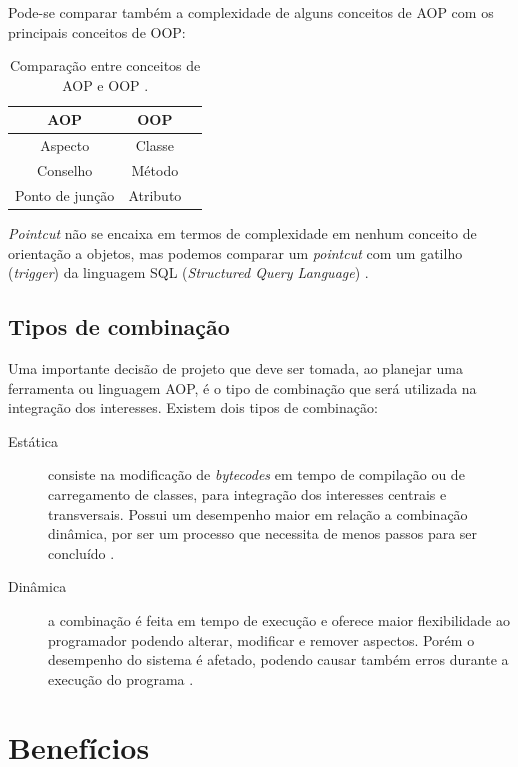 \documentclass[tc,oneside]{iiufrgs}
\begin{document}
Pode-se comparar também a complexidade de alguns conceitos de AOP com os principais conceitos de OOP:

\begin{table}[ht]
	\centering
	\caption{Comparação entre conceitos de AOP e OOP \cite{jacobson2004aspect}.}
	
	\begin{tabular}[h]{c c l}
		\hline 
		\textbf{AOP} & \textbf{OOP} \\
		\hline
		Aspecto&Classe \\
		Conselho&Método \\
		Ponto de junção&Atributo \\
		\hline
	\end{tabular}
	\label{tab:comparacaoAOPOOP}
\end{table}

\textit{Pointcut} não se encaixa em termos de complexidade em nenhum conceito de orientação a objetos, mas podemos comparar um \textit{pointcut} com um gatilho (\textit{trigger}) da linguagem SQL (\textit{Structured Query Language}) \cite{jacobson2004aspect}.

\subsection{Tipos de combinação}

Uma importante decisão de projeto que deve ser tomada, ao planejar uma ferramenta ou linguagem AOP, é o tipo de combinação que será utilizada na integração dos interesses. Existem dois tipos de combinação:

\begin{description}
\item [Estática]  consiste na modificação de \textit{bytecodes} em tempo de compilação ou de carregamento de classes, para integração dos interesses centrais e transversais. Possui um desempenho maior em relação a combinação dinâmica, por ser um processo que necessita de menos passos para ser concluído \cite{steinmacher2003estudo}.
\item [Dinâmica] a combinação é feita em tempo de execução e oferece maior flexibilidade ao programador podendo alterar, modificar e remover aspectos. Porém o desempenho do sistema é afetado, podendo causar também erros durante a execução do programa \cite{steinmacher2003estudo}. 
\end{description}

\section{Benefícios}
\end{document}
